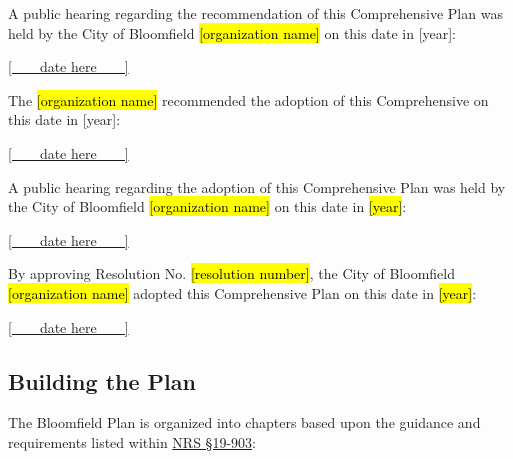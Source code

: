 \pagebreak

\noindent A public hearing regarding the recommendation of this Comprehensive Plan was held by the City of Bloomfield \hl{[organization name]} on this date in [year]:\\

\setlength{\hsize}{0.9\hsize}%
\begin{flushright}
\underline{[\,\,\,\,\,\,\,\,\,\,   
            date here     
            \,\,\,\,\,\,\,\,\,\,]
            }
\end{flushright}

\noindent The \hl{[organization name]} recommended the adoption of this Comprehensive on this date in [year]:
\begin{flushright}
\underline{[\,\,\,\,\,\,\,\,\,\,   
            date here     
            \,\,\,\,\,\,\,\,\,\,]
            }
\end{flushright}

\noindent A public hearing regarding the adoption of this Comprehensive Plan was held by the City of Bloomfield \hl{[organization name]} on this date in \hl{[year]}:

\begin{flushright}
\underline{[\,\,\,\,\,\,\,\,\,\,   
            date here     
            \,\,\,\,\,\,\,\,\,\,]
            }
\end{flushright}

\noindent By approving Resolution No. \hl{[resolution number]}, the City of Bloomfield \hl{[organization name]} adopted this Comprehensive Plan on this date in \hl{[year]}:

\begin{flushright}
\underline{[\,\,\,\,\,\,\,\,\,\,   
            date here     
            \,\,\,\,\,\,\,\,\,\,]
            }
\end{flushright}

\pagebreak

\subsection*{Building the Plan}
\noindent The Bloomfield Plan is organized into chapters based upon the guidance and requirements listed within \href{https://nebraskalegislature.gov/laws/statutes.php?statute=19-903}{NRS \S 19-903}:

